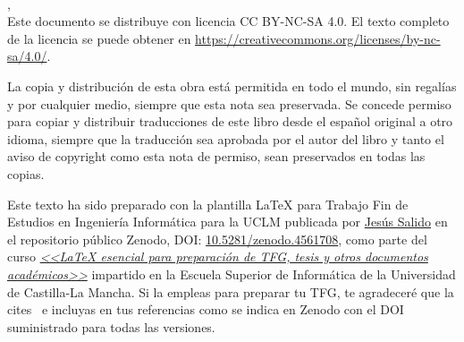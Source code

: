 %
%


\ifspanish
\else
\fi
\null\vspace{6cm}
\makeatletter
{\small \noindent \@tituloCorto\\
\textcopyright{} \@autor, \@yearTF\\[1cm]
Este documento se distribuye con licencia CC BY-NC-SA 4.0. El texto 
completo de la licencia se puede obtener en 
\url{https://creativecommons.org/licenses/by-nc-sa/4.0/}.
\makeatother

La copia y distribución de esta obra está permitida en todo el mundo, sin regalías y por cualquier medio, siempre que esta nota sea preservada. Se concede permiso para copiar y distribuir traducciones de este libro desde el español original a otro idioma, siempre que la traducción sea aprobada por el autor del libro y tanto el aviso de copyright como esta nota de permiso, sean preservados en todas las copias.


\vfill
Este texto ha sido preparado con la plantilla \LaTeX{} para Trabajo Fin de 
Estudios en Ingeniería Informática para la UCLM publicada por 
\href{https://www.esi.uclm.es/www/jsalido}{Jesús Salido} en el repositorio 
público Zenodo, DOI: 
\href{https://doi.org/10.5281/zenodo.4561708}{10.5281/zenodo.4561708}, como 
parte del curso 
\href{http://visilab.etsii.uclm.es/?page_id=1468}{\emph{<<\LaTeX{} esencial 
para preparación de TFG, tesis y otros documentos académicos>>}} impartido 
en la Escuela Superior de Informática de la Universidad de Castilla-La 
Mancha. Si la empleas para preparar tu TFG, te agradeceré que la 
cites~\cite{salido19} e incluyas en tus referencias como se indica en 
Zenodo con el DOI suministrado para todas las versiones.}


